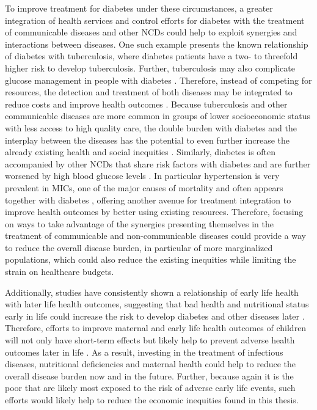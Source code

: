 To improve treatment for diabetes under these circumstances, a greater integration of health services and control efforts for diabetes with the treatment of communicable diseases and other \acp{NCD} could help to exploit synergies and interactions between diseases. One such example presents the known relationship of diabetes with tuberculosis, where diabetes patients have a two- to threefold higher risk to develop tuberculosis. Further, tuberculosis may also complicate glucose management in people with diabetes \parencite{Dooley2009}. Therefore, instead of competing for resources, the detection and treatment of both diseases may be integrated to reduce costs and improve health outcomes \parencite{Marais2013,Remais2013}. Because tuberculosis and other communicable diseases are more common in groups of lower socioeconomic status with less access to high quality care, the double burden with diabetes and the interplay between the diseases has the potential to even further increase the already existing health and social inequities \parencite{Marais2013}.  Similarly, diabetes is often accompanied by other \acp{NCD} that share risk factors with diabetes and are further worsened by high blood glucose levels \parencite{Cheung2012}. In particular hypertension is very prevalent in \acp{MIC}, one of the major causes of mortality \parencite{Mills2016} and often appears together with diabetes \parencite{Cheung2012,Barquera2013}, offering another avenue for treatment integration to improve health outcomes by better using existing resources. Therefore, focusing on ways to take advantage of the synergies presenting themselves in the treatment of communicable and non-communicable diseases could provide a way to reduce the overall disease burden, in particular of more marginalized populations, which could also reduce the existing inequities while limiting the strain on healthcare budgets.

Additionally, studies have consistently shown a relationship of early life health with later life health outcomes, suggesting that bad health and nutritional status early in life could increase the risk to develop diabetes and other diseases later  \parencite{Currie2013,Hanson2012}. Therefore, efforts to improve maternal and early life health outcomes of children will not only have short-term effects but likely help to prevent adverse health outcomes later in life \parencite{Marais2013,Bygbjerg2012}. As a result, investing in the treatment of infectious diseases, nutritional deficiencies and maternal health could help to reduce the overall disease burden now and in the future. Further, because again it is the poor that are likely most exposed to the risk of adverse early life events, such efforts would likely help to reduce the economic inequities found in this thesis.  

